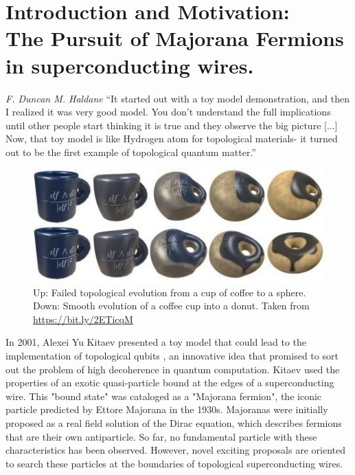 \chapter{ \label{chap:Motivation}  Introduction and Motivation: \\ The Pursuit of Majorana Fermions in superconducting wires. }

\setcounter{page}{1}

\begin{chapquote}{\textit{F. Duncan M. Haldane}}
``It started out with a toy model demonstration, and then I realized it was very good model.  You don't understand the full implications until other people start thinking it is true and they observe the big picture [...] Now, that toy model is like Hydrogen atom for topological materials- it turned out to be the first example of topological quantum matter.''
\end{chapquote}
\begin{figure}[b]
  \centering
  \includegraphics[scale = 0.5]{IMAGES/Majorana/Coffe&donuts.jpg}
  \caption{Up: Failed topological evolution from a cup of coffee to a sphere. Down: Smooth evolution of a coffee cup into a donut. \label{fig:Coffe}Taken from \url{https://bit.ly/2ETicqM} }
\end{figure}


In 2001, Alexei Yu Kitaev presented a toy model that could lead to the implementation of topological qubits \citep{kitaev_unpaired_2001}, an innovative idea that promised to sort out the problem of high decoherence in quantum computation. Kitaev used the properties of an exotic quasi-particle bound at the edges of a superconducting wire. This "bound state" was cataloged as a "Majorana fermion", the iconic particle predicted by Ettore Majorana in the 1930s. Majoranas were initially proposed as a real field solution of the Dirac equation, which describes fermions that are their own antiparticle\citep{wilczek_majorana_2009}.  So far, no fundamental particle with these characteristics has been observed. However, novel exciting  proposals are oriented to search these particles at the boundaries of topological superconducting wires. 



